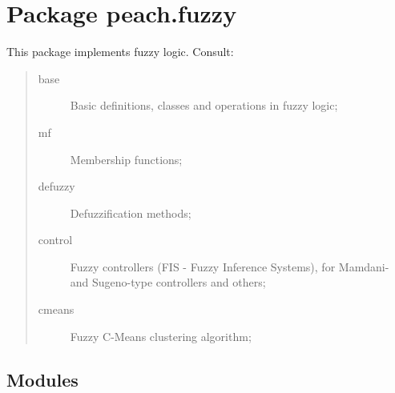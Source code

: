 %
%
%


\section{Package peach.fuzzy}

    \label{peach:fuzzy}

This package implements fuzzy logic. Consult:
%
\begin{quote}
%
\begin{description}
\item[{base}] \leavevmode 
Basic definitions, classes and operations in fuzzy logic;

\item[{mf}] \leavevmode 
Membership functions;

\item[{defuzzy}] \leavevmode 
Defuzzification methods;

\item[{control}] \leavevmode 
Fuzzy controllers (FIS - Fuzzy Inference Systems), for Mamdani- and
Sugeno-type controllers and others;

\item[{cmeans}] \leavevmode 
Fuzzy C-Means clustering algorithm;

\end{description}

\end{quote}


\subsection{Modules}

